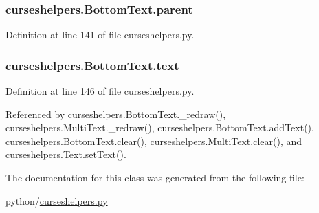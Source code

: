 \subsubsection[{parent}]{\setlength{\rightskip}{0pt plus 5cm}curseshelpers.\-Bottom\-Text.\-parent}\label{classcurseshelpers_1_1BottomText_a613145a47642613884806b3b739c0e15}


Definition at line 141 of file curseshelpers.\-py.

\subsubsection[{text}]{\setlength{\rightskip}{0pt plus 5cm}curseshelpers.\-Bottom\-Text.\-text}\label{classcurseshelpers_1_1BottomText_a30ba624d1f1200ef741de71bf5c445d1}


Definition at line 146 of file curseshelpers.\-py.



Referenced by curseshelpers.\-Bottom\-Text.\-\_\-redraw(), curseshelpers.\-Multi\-Text.\-\_\-redraw(), curseshelpers.\-Bottom\-Text.\-add\-Text(), curseshelpers.\-Bottom\-Text.\-clear(), curseshelpers.\-Multi\-Text.\-clear(), and curseshelpers.\-Text.\-set\-Text().



The documentation for this class was generated from the following file\-:\begin{DoxyCompactItemize}
\item 
python/\hyperlink{curseshelpers_8py}{curseshelpers.\-py}\end{DoxyCompactItemize}
